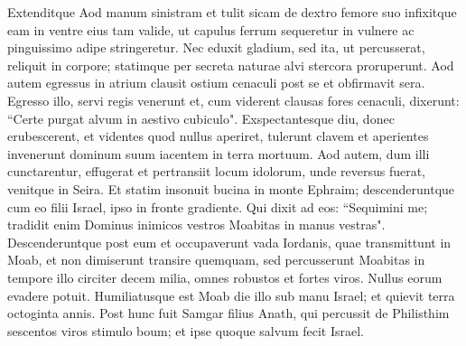 \begin{biblechapter}
\verse Extenditque Aod manum sinistram et tulit sicam de dextro femore suo infixitque eam in ventre eius 
\verse tam valide, ut capulus ferrum sequeretur in vulnere ac pinguissimo adipe stringeretur. Nec eduxit gladium, sed ita, ut percusserat, reliquit in corpore; statimque per secreta naturae alvi stercora proruperunt. 
\verse Aod autem egressus in atrium clausit ostium cenaculi post se et obfirmavit sera. 
\verse Egresso illo, servi regis venerunt et, cum viderent clausas fores cenaculi, dixerunt: “Certe purgat alvum in aestivo cubiculo". 
\verse Exspectantesque diu, donec erubescerent, et videntes quod nullus aperiret, tulerunt clavem et aperientes invenerunt dominum suum iacentem in terra mortuum. 
\verse Aod autem, dum illi cunctarentur, effugerat et pertransiit locum idolorum, unde reversus fuerat, venitque in Seira. 
\verse Et statim insonuit bucina in monte Ephraim; descenderuntque cum eo filii Israel, ipso in fronte gradiente.  
\verse Qui dixit ad eos: “Sequimini me; tradidit enim Dominus inimicos vestros Moabitas in manus vestras". Descenderuntque post eum et occupaverunt vada Iordanis, quae transmittunt in Moab, et non dimiserunt transire quemquam, 
\verse sed percusserunt Moabitas in tempore illo circiter decem milia, omnes robustos et fortes viros. Nullus eorum evadere potuit. 
\verse Humiliatusque est Moab die illo sub manu Israel; et quievit terra octoginta annis. 
\verse Post hunc fuit Samgar filius Anath, qui percussit de Philisthim sescentos viros stimulo boum; et ipse quoque salvum fecit Israel. 
\end{biblechapter}

